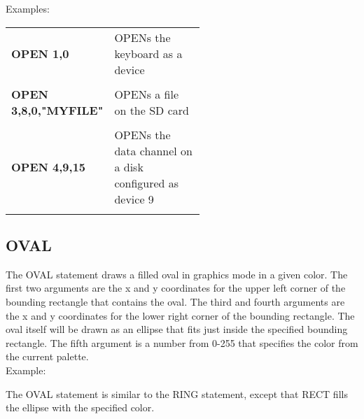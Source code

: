 Examples:\\

\begin{tabular}{l p{0.55\linewidth}}

	{\ttfamily\bfseries OPEN 1,0} & {\ttfamily OPEN}s the keyboard as a device\\\\

	{\ttfamily\bfseries OPEN 3,8,0,"MYFILE"} & {\ttfamily OPEN}s a file on the SD card\\\\

	{\ttfamily\bfseries OPEN 4,9,15} & {\ttfamily OPEN}s the data channel on a disk configured as device 9\\\\

\end{tabular}

\subsection{OVAL}

The {\ttfamily OVAL} statement draws a filled oval in graphics mode in a given
color.  The first two arguments are the x and y coordinates for the upper left
corner of the bounding rectangle that contains the oval.  The third and fourth
arguments are the x and y coordinates for the lower right corner of the
bounding rectangle.  The oval itself will be drawn as an ellipse that fits just
inside the specified bounding rectangle.  The fifth argument is a number from
0-255 that specifies the color from the current palette.\\

Example:\\


The {\ttfamily OVAL} statement is similar to the {\ttfamily RING} statement,
except that {\ttfamily RECT} fills the ellipse with the specified color.


